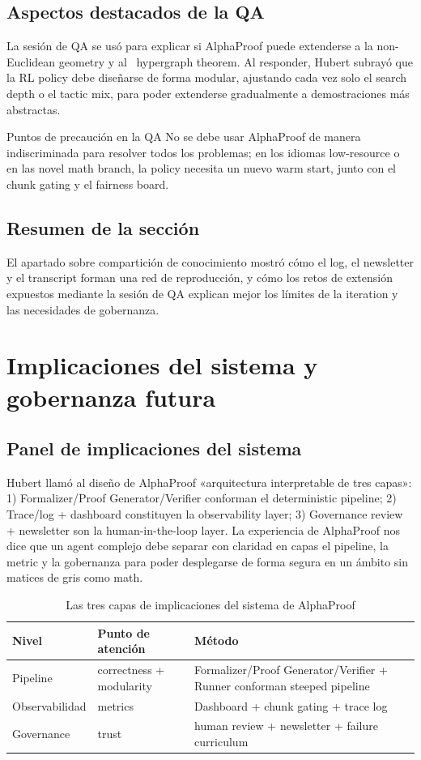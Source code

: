 \documentclass[a4paper]{article}
\begin{document}
\subsection{Aspectos destacados de la QA}
La sesión de QA se usó para explicar si AlphaProof puede extenderse a la non-Euclidean geometry y al ~hypergraph theorem. Al responder, Hubert subrayó que la RL policy debe diseñarse de forma modular, ajustando cada vez solo el search depth o el tactic mix, para poder extenderse gradualmente a demostraciones más abstractas.
\begin{warningbox}{Puntos de precaución en la QA}
No se debe usar AlphaProof de manera indiscriminada para resolver todos los problemas; en los idiomas low-resource o en las novel math branch, la policy necesita un nuevo warm start, junto con el chunk gating y el fairness board.
\end{warningbox}

\subsection{Resumen de la sección}
El apartado sobre compartición de conocimiento mostró cómo el log, el newsletter y el transcript forman una red de reproducción, y cómo los retos de extensión expuestos mediante la sesión de QA explican mejor los límites de la iteration y las necesidades de gobernanza.
\newpage

\section{Implicaciones del sistema y gobernanza futura}

\subsection{Panel de implicaciones del sistema}
Hubert llamó al diseño de AlphaProof «arquitectura interpretable de tres capas»: 1) Formalizer/Proof Generator/Verifier conforman el deterministic pipeline; 2) Trace/log + dashboard constituyen la observability layer; 3) Governance review + newsletter son la human-in-the-loop layer. La experiencia de AlphaProof nos dice que un agent complejo debe separar con claridad en capas el pipeline, la metric y la gobernanza para poder desplegarse de forma segura en un ámbito sin matices de gris como math.

\begin{table}[H]
\centering
\begin{tabular}{p{3cm}p{4cm}p{5cm}}
\toprule
Nivel & Punto de atención & Método \\
\midrule
Pipeline & correctness + modularity & Formalizer/Proof Generator/Verifier + Runner conforman steeped pipeline \\
Observabilidad & metrics & Dashboard + chunk gating + trace log \\
Governance & trust & human review + newsletter + failure curriculum \\
\bottomrule
\end{tabular}
\caption{Las tres capas de implicaciones del sistema de AlphaProof}
\end{table}
\end{document}
